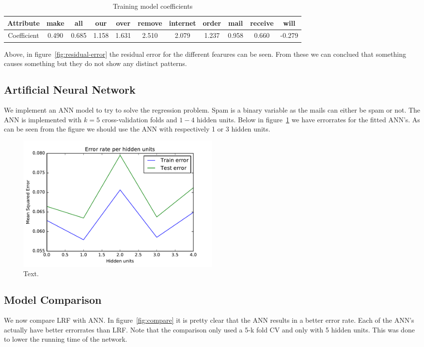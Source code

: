\documentclass[11pt, paper=a4]{article}
\begin{document}
\begin{table}[h]
  \centering
  \begin{tabular}{c|c|c|c|c|c|c|c|c|c|c}
    \hline Attribute & make & all & our & over & remove & internet &
    order & mail & receive & will \\ \hline Coefficient & 0.490 &
    0.685 & 1.158 & 1.631 & 2.510 & 2.079 & 1.237 & 0.958 & 0.660 &
    -0.279 \\ \hline
  \end{tabular}
  \caption{Training model coefficients}
\end{table}

Above, in figure~\ref{fig:residual-error} the residual error for the different fearures can
be seen. From these we can conclued that something causes something
but they do not show any distinct patterns.

\subsection{Artificial Neural Network}
We implement an ANN model to try to solve the regression problem. Spam
is a binary variable as the mails can either be spam or not. The ANN
is implemented with $k=5$ cross-validation folds and $1-4$ hidden
units. Below in figure~\ref{fig:annhid} we have errorrates for the
fitted ANN's.  As can be seen from the figure we should use the ANN
with respectively 1 or 3 hidden units.


\begin{figure}[h]
  \centering
  \includegraphics[width = 0.5\textwidth]{../../src/img/ann_regression_hid_units.pdf}
  \caption{Text.}
  \label{fig:annhid}
\end{figure}

\subsection{Model Comparison}
We now compare LRF with ANN. In figure~\ref{fig:compare} it is pretty
clear that the ANN results in a better error rate. Each of the ANN's
actually have better errorrates than LRF. Note that the comparison
only used a 5-k fold CV and only with 5 hidden units. This was done to
lower the running time of the network.
\end{document}
